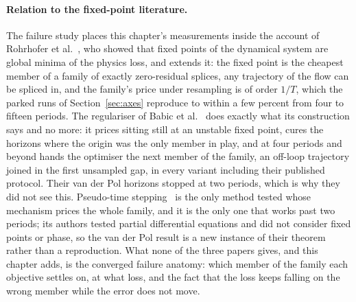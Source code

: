 \documentclass[11pt,a4paper]{article}
\begin{document}
\paragraph{Relation to the fixed-point literature.}
The failure study places this chapter's measurements inside the account of Rohrhofer et al.~\cite{rohrhofer2023}, who showed that fixed points of the dynamical system are global minima of the physics loss, and extends it: the fixed point is the cheapest member of a family of exactly zero-residual splices, any trajectory of the flow can be spliced in, and the family's price under resampling is of order $1/T$, which the parked runs of Section~\ref{sec:axes} reproduce to within a few percent from four to fifteen periods. The regulariser of Babic et al.~\cite{babic2025} does exactly what its construction says and no more: it prices sitting still at an unstable fixed point, cures the horizons where the origin was the only member in play, and at four periods and beyond hands the optimiser the next member of the family, an off-loop trajectory joined in the first unsampled gap, in every variant including their published protocol. Their van der Pol horizons stopped at two periods, which is why they did not see this. Pseudo-time stepping~\cite{wang2026pseudo} is the only method tested whose mechanism prices the whole family, and it is the only one that works past two periods; its authors tested partial differential equations and did not consider fixed points or phase, so the van der Pol result is a new instance of their theorem rather than a reproduction. What none of the three papers gives, and this chapter adds, is the converged failure anatomy: which member of the family each objective settles on, at what loss, and the fact that the loss keeps falling on the wrong member while the error does not move.
\end{document}
